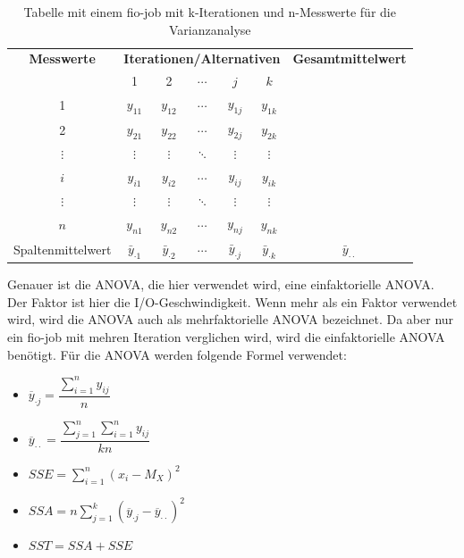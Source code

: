 \begin{table}[h!]
  \centering
  \begin{tabular}{|c|*{5}{c}|c|}
  \hline
  \textbf{Messwerte} & \multicolumn{5}{c|}{\textbf{Iterationen/Alternativen}} & \textbf{Gesamtmittelwert} \\
  \cline{2-6}
   & 1 & 2 & $\cdots$ & $j$ & $k$ & \\
  \hline
  1 & $y_{11}$ & $y_{12}$ & $\cdots$ & $y_{1j}$ & $y_{1k}$ & \\
  2 & $y_{21}$ & $y_{22}$ & $\cdots$ & $y_{2j}$ & $y_{2k}$ & \\
  $\vdots$ & $\vdots$ & $\vdots$ & $\ddots$ & $\vdots$ & $\vdots$ & \\
  $i$ & $y_{i1}$ & $y_{i2}$ & $\cdots$ & $y_{ij}$ & $y_{ik}$ & \\
  $\vdots$ & $\vdots$ & $\vdots$ & $\ddots$ & $\vdots$ & $\vdots$ & \\
  $n$ & $y_{n1}$ & $y_{n2}$ & $\cdots$ & $y_{nj}$ & $y_{nk}$ &  \\
  \hline
  Spaltenmittelwert & $\bar{y}_{\cdot1}$ & $\bar{y}_{\cdot2}$ & $\cdots$ & $\bar{y}_{\cdot j}$ & $\bar{y}_{\cdot k}$ & $\bar{y}_{\cdot \cdot}$ \\
  \hline
  \end{tabular}
  \caption{Tabelle mit einem fio-job mit k-Iterationen und n-Messwerte für die Varianzanalyse}
  \label{tab:measurements}
\end{table}

Genauer ist die ANOVA, die hier verwendet wird, eine einfaktorielle ANOVA.
Der Faktor ist hier die I/O-Geschwindigkeit. Wenn mehr als ein Faktor verwendet wird, wird die ANOVA auch als mehrfaktorielle ANOVA bezeichnet.
Da aber nur ein fio-job mit mehren Iteration verglichen wird, wird die einfaktorielle ANOVA benötigt.
Für die ANOVA werden folgende Formel verwendet:

\begin{itemize}
  \item $\overline{y}_{\cdot j} = \dfrac{\sum_{i=1}^{n} y_{ij}}{n}$
  \item $\overline{y}_{\cdot \cdot} = \dfrac{\sum_{j=1}^{n} \sum_{i=1}^{n} y_{ij}}{kn}$
  \item $SSE =  \sum_{i=1}^{n} (x_i - M_X)^2$
  \item $SSA = n \sum_{j=1}^{k} (\overline{y}_{\cdot j} - \overline{y}_{\cdot \cdot})^2$
  \item $SST = SSA + SSE$
\end{itemize}


